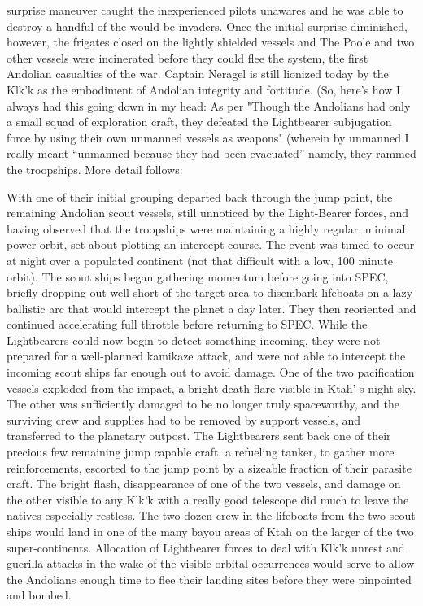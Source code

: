 \begin{itemize}
surprise maneuver caught the inexperienced pilots unawares and he was
able to destroy a handful of the would be invaders.  Once the initial
surprise diminished, however, the frigates closed on the lightly
shielded vessels and The Poole and two other vessels were incinerated
before they could flee the system, the first Andolian casualties of
the war.  Captain Neragel is still lionized today by the Klk'k as the
embodiment of Andolian integrity and fortitude.  (So, here's how I
always had this going down in my head: As per "Though the Andolians
had only a small squad of exploration craft, they defeated the
Lightbearer subjugation force by using their own unmanned vessels as
weapons" (wherein by unmanned I really meant ``unmanned because they
had been evacuated'' namely, they rammed the
troopships. More detail follows:

	With one of their initial grouping departed back through the
	jump point, the remaining Andolian scout vessels, still
	unnoticed by the Light-Bearer forces, and having observed that
	the troopships were maintaining a highly regular, minimal
	power orbit, set about plotting an intercept course. The event
	was timed to occur at night over a populated continent (not
	that difficult with a low, 100 minute orbit). The scout ships
	began gathering momentum before going into SPEC, briefly
	dropping out well short of the target area to disembark
	lifeboats on a lazy ballistic arc that would intercept the
	planet a day later. They then reoriented and continued
	accelerating full throttle before returning to SPEC. While the
	Lightbearers could now begin to detect something incoming,
	they were not prepared for a well-planned kamikaze attack, and
	were not able to intercept the incoming scout ships far enough
	out to avoid damage. One of the two pacification vessels
	exploded from the impact, a bright death-flare visible in Ktah'
	s night sky. The other was sufficiently damaged to be no
	longer truly spaceworthy, and the surviving crew and supplies
	had to be removed by support vessels, and transferred to the
	planetary outpost. The Lightbearers sent back one of their
	precious few remaining jump capable craft, a refueling tanker,
	to gather more reinforcements, escorted to the jump point by a
	sizeable fraction of their parasite craft. The bright flash,
	disappearance of one of the two vessels, and damage on the
	other visible to any Klk'k with a really good telescope did
	much to leave the natives especially restless. The two dozen
	crew in the lifeboats from the two scout ships would land in
	one of the many bayou areas of Ktah on the larger of the two
	super-continents. Allocation of Lightbearer forces to deal
	with Klk'k unrest and guerilla attacks in the wake of the
	visible orbital occurrences would serve to allow the Andolians
	enough time to flee their landing sites before they were
	pinpointed and bombed.


\end{itemize}
